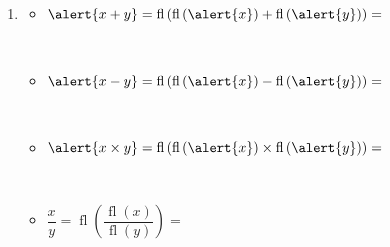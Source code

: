\begin{frame}
	\begin{solution}
		\begin{enumerate}

			\item

			      \begin{multicols}{2}
				      \begin{itemize}
					      \item

					            \begin{math}
						            \alert{x+y}=
						            \operatorname{fl}
						            \left(
						            \operatorname{fl}\left(\alert{x}\right)+
						            \operatorname{fl}\left(\alert{y}\right)
						            \right)=
					            \end{math}

					            \

					      \item

					            \begin{math}
						            \alert{x-y}=
						            \operatorname{fl}
						            \left(
						            \operatorname{fl}\left(\alert{x}\right)-
						            \operatorname{fl}\left(\alert{y}\right)
						            \right)=
					            \end{math}

					            \

					      \item

					            \begin{math}
						            \alert{x\times y}=
						            \operatorname{fl}
						            \left(
						            \operatorname{fl}\left(\alert{x}\right)\times
						            \operatorname{fl}\left(\alert{y}\right)
						            \right)=
					            \end{math}

					            \

					      \item

					            \begin{math}
						            \dfrac{x}{y}=
						            \operatorname{fl}
						            \left(
						            \dfrac{\operatorname{fl}\left(x\right)}{\operatorname{fl}\left(y\right)}
						            \right)=
					            \end{math}
				      \end{itemize}
			      \end{multicols}



\end{enumerate}
\end{solution}
\end{frame}
